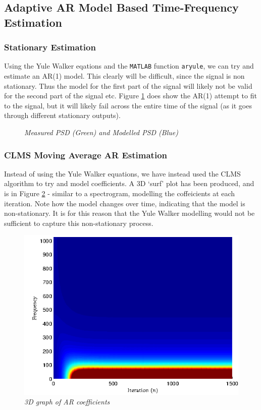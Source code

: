 \documentclass[./main.tex]{subfiles}
\begin{document}
\subsection{Adaptive AR Model Based Time-Frequency Estimation}

\subsubsection{Stationary Estimation}

Using the Yule Walker eqations and the \texttt{MATLAB} function \texttt{aryule}, we can try and estimate an AR(1) model. This clearly will be difficult, since the signal is non stationary. Thus the model for the first part of the signal will likely not be valid for the second part of the signal etc. Figure \ref{fig:4_2_a} does show the AR(1) attempt to fit to the signal, but it will likely fail across the entire time of the signal (as it goes through different stationary outputs).

\begin{figure}[h]
	\centering 
	\resizebox{\textwidth}{!}{}
	\caption{\textit{Measured PSD (Green) and Modelled PSD (Blue)}}
	\label{fig:4_2_a}
\end{figure}

\subsubsection{CLMS Moving Average AR Estimation}

Instead of using the Yule Walker equations, we have instead used the CLMS algorithm to try and model coefficients. A 3D `surf' plot has been produced, and is in Figure \ref{fig:4_2_b} - similar to a spectrogram, modelling the coffeicients at each iteration. Note how the model changes over time, indicating that the model is non-stationary. It is for this reason that the Yule Walker modelling would not be sufficient to capture this non-stationary process.

\begin{figure}[h]
	\centering 
	\includegraphics[scale=1]{fig/4/4_2_b.png}
	\caption{\textit{3D graph of AR coefficients}}
	\label{fig:4_2_b}
\end{figure}
\end{document}
